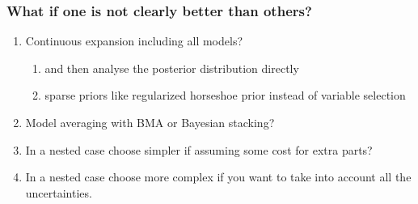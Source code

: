 \documentclass[10pt]{beamer}
\begin{document}
\begin{frame}{}

\frametitle{What if one is not clearly better than others?}

  \begin{enumerate}
  \item<2-> Continuous expansion including all models?
    \begin{enumerate}
    \item and then analyse the posterior distribution directly
      \item sparse priors like regularized horseshoe prior instead of variable selection
    \end{enumerate}
  \item<3-> Model averaging with BMA or Bayesian stacking?
  \item<4-> In a nested case choose simpler if assuming some cost for
    extra parts?
  \item<5-> In a nested case choose more complex if you want to take
    into account all the uncertainties.%
  \end{enumerate}

\end{frame}
\end{document}
